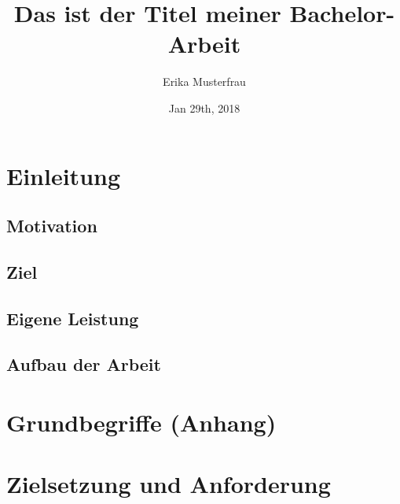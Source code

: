 \documentclass[11pt,twoside,a4paper,titlepage]{article}
\title{{Das ist der Titel meiner Bachelor-Arbeit}}
\author{Erika Musterfrau}
\date{Jan 29th, 2018}
\begin{document}
\setlength{\parindent}{0pt}






\newpage

\pagestyle{fancy}


\tableofcontents

\fancyhead[RO,LE]{\nouppercase{\leftmark}}
\fancyfoot[RO,LE]{\thepage}

\renewcommand{\headrulewidth}{0.5pt}

\setcounter{page}{1}

\newpage


\section{Einleitung}

\subsection{Motivation}

\subsection{Ziel}

\subsection{Eigene Leistung}

\subsection{Aufbau der Arbeit}

\section{Grundbegriffe (Anhang)}

\section{Zielsetzung und Anforderung}
\end{document}
